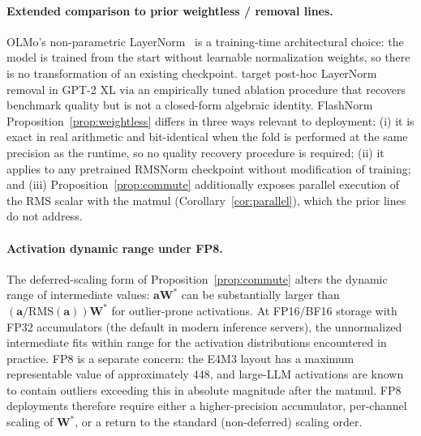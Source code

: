 \documentclass{article}
\begin{document}
\paragraph{Extended comparison to prior weightless / removal lines.} OLMo's non-parametric LayerNorm~\citep{olmo2} is a training-time architectural choice: the model is trained from the start without learnable normalization weights, so there is no transformation of an existing checkpoint. \citet{remove-norm2} target post-hoc LayerNorm removal in GPT-2 XL via an empirically tuned ablation procedure that recovers benchmark quality but is not a closed-form algebraic identity. FlashNorm Proposition~\ref{prop:weightless} differs in three ways relevant to deployment: (i) it is exact in real arithmetic and bit-identical when the fold is performed at the same precision as the runtime, so no quality recovery procedure is required; (ii) it applies to any pretrained RMSNorm checkpoint without modification of training; and (iii) Proposition~\ref{prop:commute} additionally exposes parallel execution of the RMS scalar with the matmul (Corollary~\ref{cor:parallel}), which the prior lines do not address.

\paragraph{Activation dynamic range under FP8.} The deferred-scaling form of Proposition~\ref{prop:commute} alters the dynamic range of intermediate values: $\mathbf{a}\mathbf{W}^*$ can be substantially larger than $(\mathbf{a}/\mathrm{RMS}(\mathbf{a}))\mathbf{W}^*$ for outlier-prone activations. At FP16/BF16 storage with FP32 accumulators (the default in modern inference servers), the unnormalized intermediate fits within range for the activation distributions encountered in practice. FP8 is a separate concern: the E4M3 layout has a maximum representable value of approximately 448, and large-LLM activations are known to contain outliers exceeding this in absolute magnitude after the matmul. FP8 deployments therefore require either a higher-precision accumulator, per-channel scaling of $\mathbf{W}^*$, or a return to the standard (non-deferred) scaling order.
\end{document}
